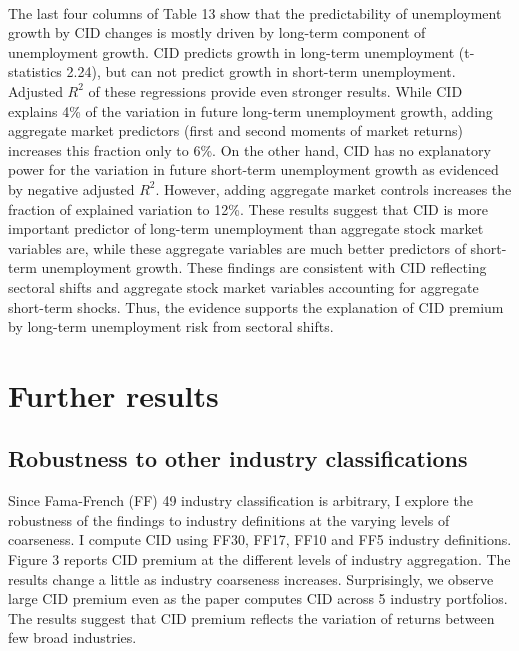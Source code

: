 \documentclass[12pt]{article}
\begin{document}
\paragraph{}
The last four columns of Table 13 show that the predictability of unemployment growth by CID changes is mostly driven by long-term component of unemployment growth. CID predicts growth in long-term unemployment (t-statistics 2.24), but can not predict growth in short-term unemployment. Adjusted $R^2$ of these regressions provide even stronger results. While CID explains 4\% of the variation in future long-term unemployment growth, adding aggregate market predictors (first and second moments of market returns) increases this fraction only to 6\%. On the other hand, CID has no explanatory power for the variation in future short-term unemployment growth as evidenced by negative adjusted $R^2$. However, adding aggregate market controls increases the fraction of explained variation to 12\%. These results suggest that CID is more important predictor of long-term unemployment than aggregate stock market variables are, while these aggregate variables are much better predictors of short-term unemployment growth. These findings are consistent with CID reflecting sectoral shifts and aggregate stock market variables accounting for aggregate short-term shocks. Thus, the evidence supports the explanation of CID premium by long-term unemployment risk from sectoral shifts.

\section{Further results} \label{sec:Model}
\subsection{Robustness to other industry classifications}

Since Fama-French (FF) 49 industry classification is arbitrary, I explore the robustness of the findings to industry definitions at the varying levels of coarseness. I compute CID using FF30, FF17, FF10 and FF5 industry definitions. Figure 3 reports CID premium at the different levels of industry aggregation. The results change a little as industry coarseness increases. Surprisingly, we observe large CID premium even as the paper computes CID across 5 industry portfolios. The results suggest that CID premium reflects the variation of returns between few broad industries. 
\end{document}
